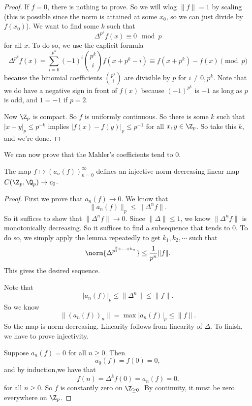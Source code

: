 \documentclass[a4paper]{article}
\begin{document}
\begin{proof}
  If $f =0 $, there is nothing to prove. So we will wlog $\|f\| = 1$ by scaling (this is possible since the norm is attained at some $x_0$, so we can just divide by $f(x_0)$). We want to find some $k$ such that
  \[
    \Delta^{p^k}f(x) \equiv 0 \mod p
  \]
  for all $x$. To do so, we use the explicit formula
  \[
    \Delta^{p^k} f(x) = \sum_{i = 0}^{p^k} (-1)^i \binom{p^k}{i} f(x + p^k - i) \equiv f(x + p^k) - f(x)\pmod p
  \]
  because the binomial coefficients $\binom{p^k}{i}$ are divisible by $p$ for $i \not= 0, p^k$. Note that we do have a negative sign in front of $f(x)$ because $(-1)^{p^k}$ is $-1$ as long as $p$ is odd, and $1 = -1$ if $p = 2$.

  Now $\Z_p$ is compact. So $f$ is uniformly continuous. So there is some $k$ such that $|x - y|_p \leq p^{-k}$ implies $|f(x) - f(y)|_p \leq p^{-1}$ for all $x, y \in \Z_p$. So take this $k$, and we're done.
\end{proof}

We can now prove that the Mahler's coefficients tend to $0$.

\begin{prop}
  The map $f \mapsto (a_n(f))_{n = 0}^\infty$ defines an injective norm-decreasing linear map $C(\Z_p, \Q_p) \to c_0$.
\end{prop}

\begin{proof}
  First we prove that $a_n(f) \to 0$. We know that
  \[
    \|a_n(f)\|_p \leq \|\Delta^n f\|.
  \]
  So it suffices to show that $\|\Delta^n f\| \to 0$. Since $\|\Delta\| \leq 1$, we know $\|\Delta^n f\|$ is monotonically decreasing. So it suffices to find a subsequence that tends to $0$. To do so, we simply apply the lemma repeatedly to get $k_1, k_2, \cdots$ such that
  \[
    \norm{\Delta^{p^{^k_1 + \ldots + k_n}}} \leq \frac{1}{p^n}\|f\|.
  \]
  This gives the desired sequence.

  Note that
  \[
    |a_n(f)|_p \leq \|\Delta^n\| \leq \|f\|.
  \]
  So we know
  \[
    \|(a_n(f))_n\| = \max |a_n(f)|_p \leq \|f\|.
  \]
  So the map is norm-decreasing. Linearity follows from linearity of $\Delta$. To finish, we have to prove injectivity.

  Suppose $a_n(f) = 0$ for all $n \geq 0$. Then
  \[
    a_0(f) = f(0) = 0,
  \]
  and by induction,we have that
  \[
    f(n) = \Delta^k f(0) = a_n (f) = 0.
  \]
  for all $n \geq 0$. So $f$ is constantly zero on $\Z_{\geq 0}$. By continuity, it must be zero everywhere on $\Z_p$.
\end{proof}
\end{document}
